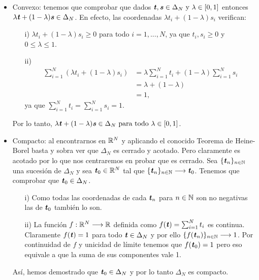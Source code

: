 \begin{itemize}
	\item  Convexo: tenemos que comprobar que dados $ \textbf{\emph{t}}, \textbf{\emph{s}} \in \Delta_N \text{ y } \lambda \in \lbrack 0,1 \rbrack $ entonces $ \lambda\textbf{\emph{t}} + (1-\lambda)\textbf{\emph{s}} \in \Delta_N $. En efecto, las coordenadas $ \lambda t_i + (1-\lambda)s_i $ verifican:
	\begin{itemize}
		\item [i) ] $ \lambda t_i + (1-\lambda)s_i \geq 0 $ para todo $ i = 1,..., N $, ya que $ t_i, s_i \geq 0 $ y $ 0 \leq \lambda \leq 1 $.
		\item [ii) ] 
		\begin{equation*}
		\begin{split}
		\sum_{i=1}^{N} (\lambda t_i + (1-\lambda)s_i) &=   \lambda \sum_{i=1}^{N} t_i + (1-\lambda)\sum_{i=1}^{N} s_i \\
		&= \lambda + (1 - \lambda) \\ &= 1,
		\end{split}
		\end{equation*}ya que $ \sum_{i=1}^{N} t_i = \sum_{i=1}^{N} s_i = 1  $.
	\end{itemize}
	
	Por lo tanto, $ \lambda\textbf{\emph{t}} + (1-\lambda)\textbf{\emph{s}} \in \Delta_N \text{ para todo }\lambda \in \lbrack 0,1 \rbrack $.
	
	\item Compacto: al encontrarnos en $ \mathbb{R}^N $ y aplicando el conocido Teorema de Heine-Borel basta y sobra ver que $ \Delta_N $ es cerrado y acotado. Pero claramente es acotado por lo que nos centraremos en probar que es cerrado. Sea $ \lbrace \textbf{\emph{t}}_n \rbrace_{ n \in \mathbb{N}} $ una sucesión de $ \Delta_N $ y sea $ \textbf{\emph{t}}_0 \in \mathbb{R}^N $ tal que $ \lbrace \textbf{\emph{t}}_n \rbrace_{ n \in \mathbb{N}} \longrightarrow \textbf{\emph{t}}_0 $. Tenemos que comprobar que $ \textbf{\emph{t}}_0 \in \Delta_N $. 
	\begin{itemize}
		\item[i) ] Como todas las coordenadas de cada $ \textbf{\emph{t}}_n $ para $ n \in \mathbb{N} $ son no negativas las de $ \textbf{\emph{t}}_0 $ también lo son.
		\item[ii) ] La función $ f: \mathbb{R}^N \longrightarrow \mathbb{R} $ definida como $ f(\textbf{\emph{t}}) =  \sum_{i=1}^{N} t_i $ es continua. Claramente $ f(\textbf{\emph{t}}) = 1 $ para todo $ \textbf{\emph{t}} \in \Delta_N $ y por ello $ \lbrace f(\textbf{\emph{t}}_n) \rbrace_{ n \in \mathbb{N}} \longrightarrow 1$. Por continuidad de $ f $ y unicidad de límite tenemos que $ f(\textbf{\emph{t}}_0) = 1 $ pero eso equivale a que la suma de sus componentes vale 1.
	\end{itemize} 
	
	Así, hemos demostrado que $ \textbf{\emph{t}}_0 \in \Delta_N $ y por lo tanto $ \Delta_N $ es compacto. 
\end{itemize}


